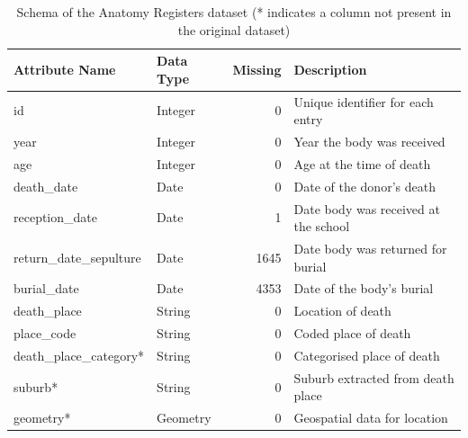 \begin{table}[ht]
\centering
\caption{Schema of the Anatomy Registers dataset (* indicates a column not present in the original dataset)}
\label{tab:full-schema}
\begin{tabular}{llrl}
\toprule
\textbf{Attribute Name} & \textbf{Data Type} & \textbf{Missing} & \textbf{Description} \\
\midrule
id                      & Integer            & 0                      & Unique identifier for each entry \\
year                    & Integer            & 0                      & Year the body was received \\
age                     & Integer            & 0                      & Age at the time of death \\
death\_date             & Date               & 0                      & Date of the donor's death \\
reception\_date         & Date               & 1                      & Date body was received at the school \\
return\_date\_sepulture & Date               & 1645                   & Date body was returned for burial \\
burial\_date            & Date               & 4353                   & Date of the body's burial \\
death\_place            & String             & 0                      & Location of death \\
place\_code             & String             & 0                      & Coded place of death \\
death\_place\_category* & String             & 0                      & Categorised place of death \\
suburb*                 & String             & 0                      & Suburb extracted from death place \\
geometry*               & Geometry           & 0                      & Geospatial data for location \\
\bottomrule
\end{tabular}
\end{table}
